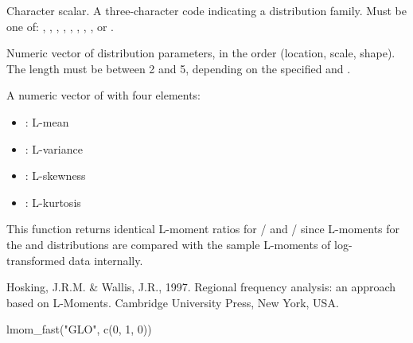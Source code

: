 \documentclass[a4paper]{book}
\begin{document}
%
\begin{Arguments}
\begin{ldescription}
\item[\code{distribution}] Character scalar. A three-character code indicating
a distribution family. Must be one of: , , ,
, , , , , or .

\item[\code{params}] Numeric vector of distribution parameters, in the order (location,
scale, shape). The length must be between 2 and 5, depending on the specified
 and .
\end{ldescription}
\end{Arguments}
%
\begin{Value}
A numeric vector of with four elements:
\begin{itemize}

\item{} : L-mean
\item{} : L-variance
\item{} : L-skewness
\item{} : L-kurtosis

\end{itemize}

\end{Value}
%
\begin{Note}
This function returns identical L-moment ratios for / and
/ since L-moments for the  and  distributions are
compared with the sample L-moments of log-transformed data internally.
\end{Note}
%
\begin{References}
Hosking, J.R.M. \& Wallis, J.R., 1997. Regional frequency analysis: an approach based
on L-Moments. Cambridge University Press, New York, USA.
\end{References}
%
\begin{SeeAlso}
\end{SeeAlso}
%
\begin{Examples}
\begin{ExampleCode}
lmom_fast("GLO", c(0, 1, 0))

\end{ExampleCode}
\end{Examples}
\end{document}
